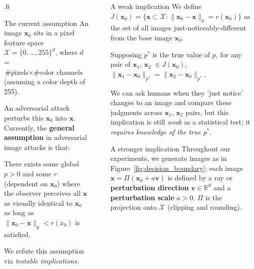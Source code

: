 \documentclass[final,notheorems]{beamer}
\newlength{\sepwidth}
\newlength{\colwidth}
\newcommand{\separatorcolumn}{\begin{column}{\sepwidth}\end{column}}
\providecommand{\norm}[1]{\lVert#1\rVert}
\def\bfx{\mathbf x}
\def\bfv{\mathbf v}
\def\X{\mathcal X}
\def\R{\mathbb R}
\begin{document}
\begin{frame}[t]
\begin{columns}[t]
\begin{column}{.6\colwidth}
  \begin{alertblock}{The current assumption}
    An image $\bfx_0$ sits in a pixel feature space $\X = \{0,\ldots,255\}^d$, where $d$ = $\text{\# pixels} \times \text{\# color channels}$ (assuming a color depth of 255).

    An adversarial attack perturbs this $\bfx_0$ into $\bfx$. Currently, the \textbf{general assumption} in adversarial image attacks is that:

    \hspace*{.1\linewidth}\colorbox{highlightbg}{\begin{minipage}{.8\linewidth}
      There exists some global $p>0$ and some $r$ (dependent on $\bfx_0$) where the observer perceives all $\bfx$ as visually identical to $\bfx_0$ as long as $\norm{\bfx_0-\bfx}_p < r(x_0)$ is satisfied.
    \end{minipage}}

    We refute this assumption via \emph{testable implications}.
  \end{alertblock}
\end{column}

\separatorcolumn

\begin{column}{\colwidth}
    \begin{block}{A weak implication}
    We define $J(\bfx_0) = \{\bfx \subset \X : \norm{\bfx_0-\bfx}_p = r(\bfx_0)\}$ as the set of all images just-noticeably-different from the base image $\bfx_0$.

    \hspace*{.1\linewidth}\colorbox{highlightbg}{\begin{minipage}{.8\linewidth}
      Supposing $p^*$ is the true value of $p$, for any pair of $\bfx_1$, $\bfx_2$ $\in J(\bfx_0)$, $\norm{\bfx_1-\bfx_0}_{p^*} = \norm{\bfx_2-\bfx_0}_{p^*}$.
    \end{minipage}}

    We can ask humans when they 'just notice' changes to an image and compare these judgments across $\bfx_1$, $\bfx_2$ pairs, but this implication is still \emph{weak} as a statistical test; it \emph{requires knowledge of the true $p^*$}.
  \end{block}

  \begin{block}{A stronger implication}
    Throughout our experiments, we generate images as in Figure~\ref{fig:decision_boundary};
    each image $\bfx = \Pi(\bfx_0+a\bfv)$ is defined by a ray or \textbf{perturbation direction} $\bfv \in \R^d$ and a \textbf{perturbation scale} $a>0$.
    $\Pi$ is the projection onto $\X$ (clipping and rounding).


\end{block}
\end{column}
\end{columns}
\end{frame}
\end{document}
